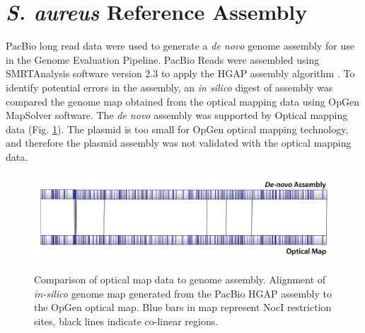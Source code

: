 \documentclass{article}\usepackage[]{graphicx}\usepackage[]{color}
\begin{document}
\section{\emph{S. aureus} Reference Assembly}
PacBio long read data were used to generate a \emph{de novo} genome assembly for use in the Genome Evaluation Pipeline. PacBio Reads were assembled using SMRTAnalysis software version 2.3  to apply the HGAP assembly algorithm \cite{Koren2013}.  To identify potential errors in the assembly, an \emph{in silico} digest of assembly was compared the genome map obtained from the optical mapping data using OpGen MapSolver software. The \emph{de novo} assembly was supported by Optical mapping data (Fig. \ref{fig:opgenCompFig}). The plasmid is too small for OpGen optical mapping technology, and therefore the plasmid assembly was not validated with the optical mapping data. 

\begin{figure}
\includegraphics[width=\textwidth]{opgen_assembly_comparison.png}
\label{fig:opgenCompFig}
\caption{Comparison of optical map data to genome assembly. Alignment of \emph{in-silico} genome map generated from the PacBio HGAP assembly to the OpGen optical map.  Blue bars in map represent NocI restriction sites, black lines indicate co-linear regions.}
\end{figure}

\printbibliography
\end{document}
